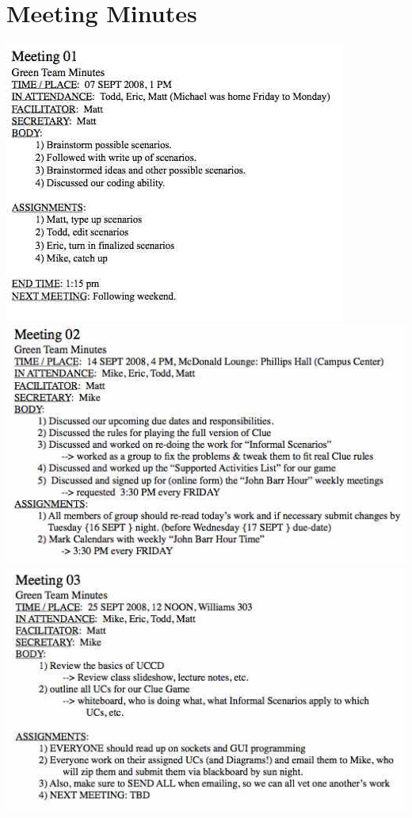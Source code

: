\part{Meeting Minutes}



\begin{flushleft}
	\includegraphics{../DesignDocumentation/Minutes/Minutes_01.jpg}
	\newpage
	\includegraphics[scale=0.75]{../DesignDocumentation/Minutes/Minutes_02.jpg}
	\newpage
	\includegraphics[scale=0.75]{../DesignDocumentation/Minutes/Minutes_03.jpg}

\end{flushleft}
